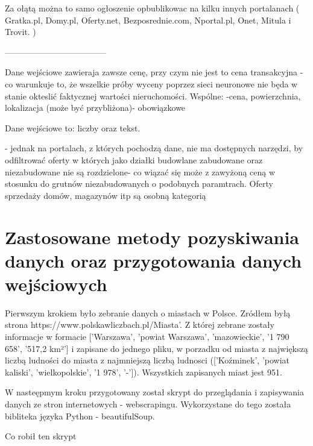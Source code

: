 \documentclass[a4paper,12pt,twoside,openany]{report}
\begin{document}
Za ołątą można to samo ogłoszenie opbublikowac na kilku innych portalanach ( Gratka.pl, Domy.pl, Oferty.net, Bezposrednie.com, Nportal.pl, Onet, Mitula i Trovit. )

------------------------------------


Dane wejściowe zawieraja zawsze cenę, przy czym nie jest to cena transakcyjna - co warunkuje to, że wszelkie próby wyceny poprzez sieci neuronowe nie będa w stanie okteslić faktycznej wartości nieruchomości.
Wspólne:
-cena, powierzchnia, lokalizacja (może być przybliżona)- obowiązkowe

Dane wejściowe to: liczby oraz tekst.


- jednak na portalach, z których pochodzą dane, nie ma dostępnych narzędzi, by odfiltrować oferty w których jako działki budowlane zabudowane oraz niezabudowane nie są rozdzielone- co wiązać się może z zawyżoną ceną w stosunku do grutnów niezabudowanych o podobnych paramtrach.
Oferty sprzedaży domów, magazynów itp są osobną kategorią




\chapter{Zastosowane metody pozyskiwania danych oraz przygotowania danych wejściowych}

 
 
Pierwszym krokiem było zebranie danych o miastach w Polsce.
Zródłem byłą strona https://www.polskawliczbach.pl/Miasta'. Z której zebrane zostały informacje w formacie ['Warszawa', 'powiat Warszawa', 'mazowieckie', '1 790 658', '517,2 km²']
i zapisane do jednego pliku, w porzadku od miasta z największą liczbą ludności do miasta z najmniejszą liczbą ludnosci (['Koźminek', 'powiat kaliski', 'wielkopolskie', '1 978', '-']).
Wszystkich zapisanych miast jest 951.

W nasteępmym kroku przygotowany został skrypt do przeglądania i zapisywania danych ze stron internetowych - webscrapingu.
Wykorzystane do tego została bibliteka języka Python - beautifulSoup.

Co robił ten skrypt
\end{document}
